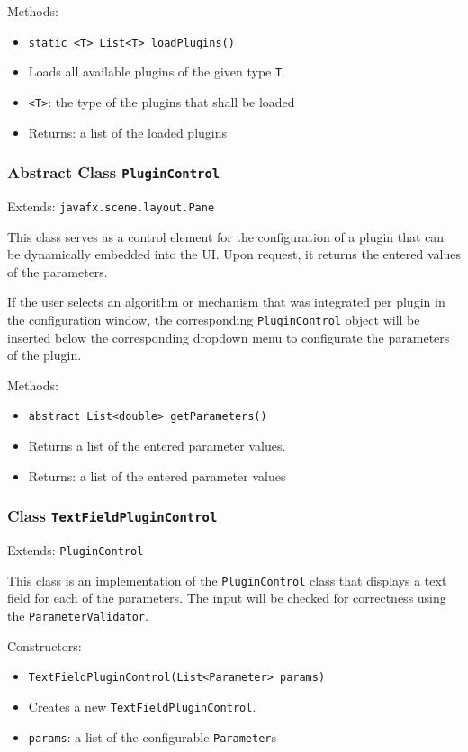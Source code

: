 \documentclass[parskip=full,11pt]{scrartcl}
\begin{document}
Methods:

\begin{itemize}\itemsep -10pt
	\item \texttt{static <T> List<T> loadPlugins()}
	\item[] Loads all available plugins of the given type \texttt{T}.
	\item[] \texttt{<T>}: the type of the plugins that shall be loaded
	\item[]Returns: a list of the loaded plugins
\end{itemize}

\subsubsection{Abstract Class \texttt{PluginControl}}
Extends: \texttt{javafx.scene.layout.Pane}

This class serves as a control element for the configuration of a plugin that can be dynamically embedded into the UI. Upon request, it returns the entered values of the parameters.

If the user selects an algorithm or mechanism that was integrated per plugin in the configuration window, the corresponding \texttt{PluginControl} object will be inserted below the corresponding dropdown menu to configurate the parameters of the plugin.

Methods:

\begin{itemize}\itemsep -10pt
	\item \texttt{abstract List<double> getParameters()}
	\item[] Returns a list of the entered parameter values.
	\item[] Returns: a list of the entered parameter values
\end{itemize}

\subsubsection{Class \texttt{TextFieldPluginControl}}
Extends: \texttt{PluginControl}

This class is an implementation of the \texttt{PluginControl} class that displays a text field for each of the parameters. The input will be checked for correctness using the \texttt{ParameterValidator}.

Constructors:

\begin{itemize}\itemsep -10pt
	\item \texttt{TextFieldPluginControl(List<Parameter> params)}
	\item[] Creates a new \texttt{TextFieldPluginControl}.
	\item[] \texttt{params}: a list of the configurable \texttt{Parameter}s
\end{itemize}
\end{document}
